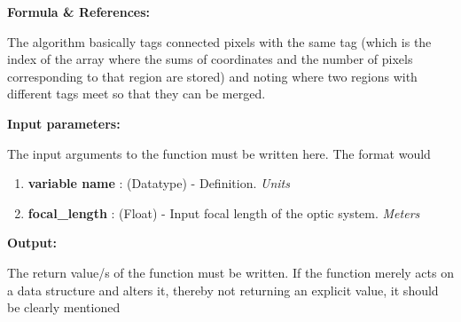 \documentclass[a4paper, oneside,11pt]{article}
\begin{document}
\textbf{Formula \& References:}

The algorithm basically tags connected pixels with the same tag (which is the index of the array where the sums of coordinates  and the number of pixels corresponding to that region are stored) and noting where two regions with different tags meet so that they can be merged.\cite{image_seg}


\textbf{Input parameters:}

The input arguments to the function must be written here. The format would 
\begin{enumerate}
    \item \textbf{variable name} : (Datatype) - Definition. \textit{Units}
    
    \item \textbf{focal\_length} : (Float) -  Input focal length of the optic system. \textit{Meters}
\end{enumerate} 


\textbf{Output:}

The return value/s of the function must be written. If the function merely acts on a data structure and alters it, thereby not returning an explicit value, it should be clearly mentioned 





\end{document}
